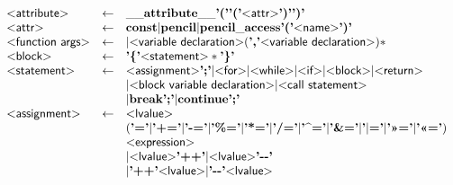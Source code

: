 \begin{figure}
\[\begin{array}{lcl}
  \text{\sf\textless attribute\textgreater} & \gets & \mathbf{\_\_attribute\_\_} \text{\bf'('}\text{\bf'('} \text{\sf\textless attr\textgreater} \text{\bf')'}\text{\bf')'}\\

  \text{\sf\textless attr\textgreater} & \gets & \mathbf{const} 
                          | \mathbf{pencil} 
                          |\mathbf{pencil\_access} \text{\bf'('} \text{\sf\textless name\textgreater} \text{\bf')'}
\\

  \text{\sf\textless function args\textgreater} & \gets & | \text{\sf\textless variable declaration\textgreater} (\text{\bf','} \text{\sf\textless variable declaration\textgreater})*\\

  \text{\sf\textless block\textgreater} & \gets & \text{\bf'\{'} \text{\sf\textless statement\textgreater} * \text{\bf'\}'}\\

  \text{\sf\textless statement\textgreater} & \gets & \text{\sf\textless assignment\textgreater} \text{\bf';'}
                               | \text{\sf\textless for\textgreater}
                               | \text{\sf\textless while\textgreater}
                               | \text{\sf\textless if\textgreater}
                               | \text{\sf\textless block\textgreater}
                               | \text{\sf\textless return\textgreater}\\ & &
                               | \text{\sf\textless block variable declaration\textgreater}
                               | \text{\sf\textless call statement\textgreater}\\ & &
                               | \mathbf{break} \text{\bf';'}
                               | \mathbf{continue} \text{\bf';'}
  \\

  \text{\sf\textless assignment\textgreater} & \gets & \text{\sf\textless lvalue\textgreater}\\&& (\text{\bf'='}
                                                        | \text{\bf'+='}
                                                        | \text{\bf'-='}
                                                        | \text{\bf'\%='}
                                                        | \text{\bf'*='}
                                                        | \text{\bf'/='}
                                                        | \text{\bf'\textasciicircum='}
                                                        | \text{\bf'\&='}
                                                        | \text{\bf'$|$='}
                                                        | \text{\bf'\textgreater\textgreater='}
                                                        | \text{\bf'\textless\textless='})\\&&
                                                         \text{\sf\textless expression\textgreater}\\ & &
                                                      | \text{\sf\textless lvalue\textgreater} \text{\bf'++'}
                                                      | \text{\sf\textless lvalue\textgreater} \text{\bf'{-}{-}'}\\&&
                                  |\text{\bf'++'} \text{\sf\textless lvalue\textgreater}
                                  |\text{\bf'{-}{-}'} \text{\sf\textless lvalue\textgreater}\\


\end{array}\]
\end{figure}

